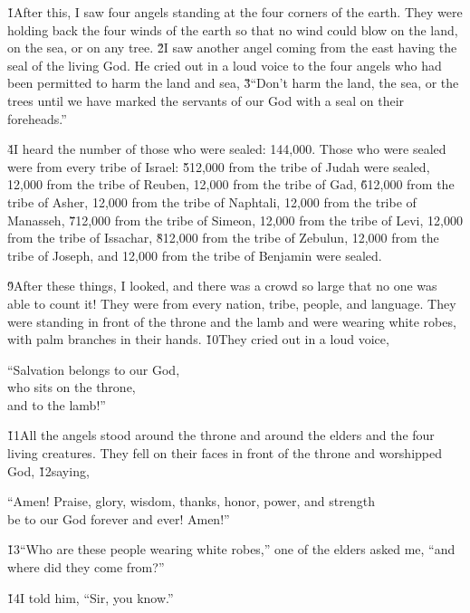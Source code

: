 \v{1}After this, I saw four angels standing at the four corners of the earth. They were holding back the four winds of the earth so that no wind could blow on the land, on the sea, or on any tree. \v{2}I saw another angel coming from the east having the seal of the living God. He cried out in a loud voice to the four angels who had been permitted to harm the land and sea, \v{3}``Don't harm the land, the sea, or the trees until we have marked the servants of our God with a seal on their foreheads.''

\v{4}I heard the number of those who were sealed: 144,000. Those who were sealed were from every tribe of Israel: \v{5}12,000 from the tribe of Judah were sealed, 12,000 from the tribe of Reuben, 12,000 from the tribe of Gad, \v{6}12,000 from the tribe of Asher, 12,000 from the tribe of Naphtali, 12,000 from the tribe of Manasseh, \v{7}12,000 from the tribe of Simeon, 12,000 from the tribe of Levi, 12,000 from the tribe of Issachar, \v{8}12,000 from the tribe of Zebulun, 12,000 from the tribe of Joseph, and 12,000 from the tribe of Benjamin were sealed.

\v{9}After these things, I looked, and there was a crowd so large that no one was able to count it! They were from every nation, tribe, people, and language. They were standing in front of the throne and the lamb and were wearing white robes, with palm branches in their hands. \v{10}They cried out in a loud voice,

\begin{poetry}
\poeml ``Salvation belongs to our God, \\
\poemll    who sits on the throne, \\
\poemlll       and to the lamb!''
\end{poetry}

\v{11}All the angels stood around the throne and around the elders and the four living creatures. They fell on their faces in front of the throne and worshipped God, \v{12}saying,

\begin{poetry}
\poeml ``Amen! Praise, glory, wisdom, thanks, honor, power, and strength \\
\poemll    be to our God forever and ever! Amen!''
\end{poetry}

\v{13}``Who are these people wearing white robes,'' one of the elders asked me, ``and where did they come from?''

\v{14}I told him, ``Sir, you know.''

